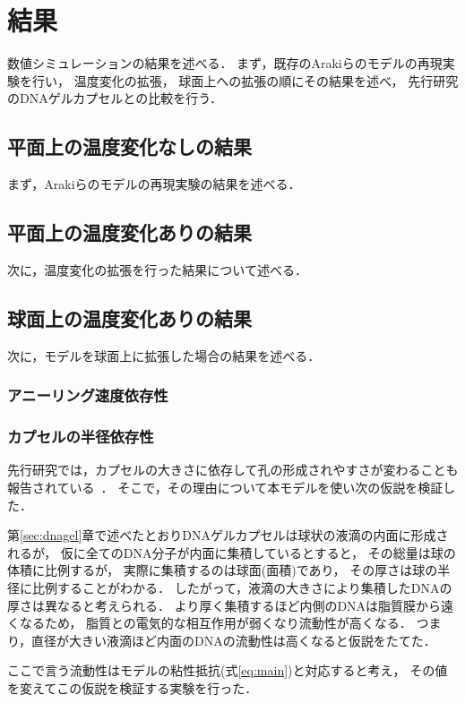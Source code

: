 \chapter{結果}

数値シミュレーションの結果を述べる．
まず，既存のArakiらのモデルの再現実験を行い，
温度変化の拡張，
球面上への拡張の順にその結果を述べ，
先行研究のDNAゲルカプセルとの比較を行う．

\section{平面上の温度変化なしの結果}

まず，Arakiらのモデルの再現実験の結果を述べる．

\section{平面上の温度変化ありの結果}

次に，温度変化の拡張を行った結果について述べる．


\section{球面上の温度変化ありの結果}

次に，モデルを球面上に拡張した場合の結果を述べる．

\subsection{アニーリング速度依存性}


\subsection{カプセルの半径依存性}
先行研究では，カプセルの大きさに依存して孔の形成されやすさが変わることも報告されている~\cite{morita2017formation}．
そこで，その理由について本モデルを使い次の仮説を検証した．

第\ref{sec:dnagel}章で述べたとおりDNAゲルカプセルは球状の液滴の内面に形成されるが，
仮に全てのDNA分子が内面に集積しているとすると，
その総量は球の体積に比例するが，
実際に集積するのは球面(面積)であり，
その厚さは球の半径に比例することがわかる．
したがって，液滴の大きさにより集積したDNAの厚さは異なると考えられる．
より厚く集積するほど内側のDNAは脂質膜から遠くなるため，
脂質との電気的な相互作用が弱くなり流動性が高くなる．
つまり，直径が大きい液滴ほど内面のDNAの流動性は高くなると仮説をたてた．

ここで言う流動性はモデルの粘性抵抗(式\ref{eq:main})と対応すると考え，
その値を変えてこの仮説を検証する実験を行った．
